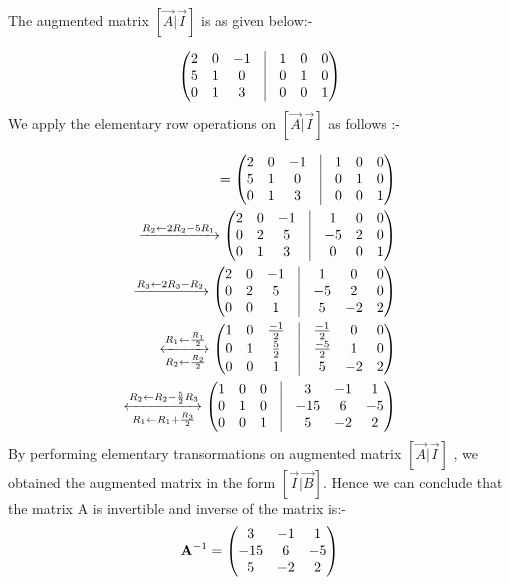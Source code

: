 The augmented matrix $ [\vec{A} | \vec{I}]$ is as given below:- 

\begin{align}
\myvec{
	2 &0 &-1& \vrule & 1 & 0 &  0 \\
		   5 &1 &0&  \vrule & 0 &  1 &  0 \\
		 0 &1 &3 &  \vrule & 0 &  0 &  1 \\
		 }
 \end{align}
 We apply the elementary row operations on $ [\vec{A} | \vec{I}]$ as follows :-
 
\begin{align}
 [\vec{A} | \vec{I}] = \myvec{
		 2 &0 &-1&  \vrule & 1 & 0 &  0 \\
		   5 &1 &0&  \vrule & 0 &  1 &  0 \\
		 0 &1 &3 &  \vrule & 0 &  0 &  1 \\
		 } \\
\xrightarrow{R_2\leftarrow 2R_2 - 5R_1} \myvec{
		 2 &0 &-1&  \vrule & 1 & 0 &  0 \\
		  0 &2 &5&  \vrule & -5 &  2 &  0 \\
		 0 &1 &3 &  \vrule & 0 &  0 &  1 \\
		 } 
		 \\
 \xrightarrow{R_3\leftarrow 2R_3 - R_2} \myvec{
		 2 &0 &-1&  \vrule & 1 & 0 &  0 \\
		  0 &2 &5&  \vrule & -5 &  2 &  0 \\
		 0 &0 &1 &  \vrule & 5 &  -2 &  2 \\
		 } \\
\xleftrightarrow[R_2\leftarrow \frac{R_2}{2}]{R_1\leftarrow \frac{R_1}{2}}\myvec{
	1 & 0 & \frac{-1}{2} &\vrule & \frac{-1}{2} & 0 &  0 \\[1pt]
		  0 & 1 & \frac{5}{2} &\vrule & \frac{-5}{2} &  1 &  0 \\[1pt]
		 0 & 0 &1 &\vrule &  5 &  -2 &  2 \\
		 } 	\\	 
\xleftrightarrow[R_1\leftarrow R_1  + \frac{R_3}{2}]{R_2\leftarrow R_2 - \frac{5}{2}R_3}\myvec{
		 1 & 0 & 0 &\vrule  & 3 & -1 &  1 \\
		  0 & 1 & 0 & \vrule  & -15 &  6 &  -5 \\
		 0 & 0 &1 &\vrule &   5 &  -2 &  2 \\
		 } 		
\end{align}
By performing elementary transormations on augmented matrix $ [\vec{A} | \vec{I}]$ , we obtained the augmented matrix in the form $ [\vec{I} | \vec{B}]$. 
Hence we can conclude that the matrix A is invertible and inverse of the matrix is:-
\begin{align}
	\mathbf{A}^{-1} = \begin{pmatrix} 
		  3 & -1 &  1 \\
		 -15 &  6 & -5 \\
		  5 &  -2 &  2 \\
		 \end{pmatrix}
\end{align}

